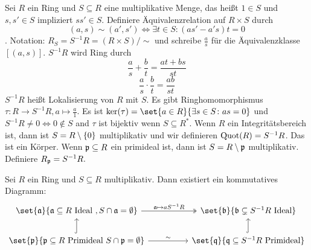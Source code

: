 \begin{Def}
    Sei \(R\) ein Ring und \(S\subseteq R\) eine multiplikative Menge, das heißt \(1\in S\) und \(s,s'\in S\) impliziert \(ss'\in S\).
    Definiere Äquivalenzrelation auf \(R\times S\) durch \[(a,s)\sim (a',s')\iff \exists t\in S\colon (as'-a's)t=0\]. Notation: \(R_S=S^{-1}R=(R\times S)/\sim\) und schreibe \(\frac a s\) für die Äquivalenzklasse \([(a,s)]\).
    \(S^{-1}R\) wird Ring durch 
    \[\frac a s+\frac b t=\frac{at+bs}{st}\]
    \[\frac a s\cdot \frac b t=\frac{ab}{st}\]
    \(S^{-1}R\) heißt Lokalisierung von \(R\) mit \(S\).
    Es gibt Ringhomomorphismus \(\tau:R\to S^{-1}R,a\mapsto \frac a 1\).
    Es ist \(\ker(\tau)=\set{ a\in R}{\exists s\in S\colon as=0}\) und \(S^{-1}R\neq 0 \iff 0\not\in S\) and \(\tau \) ist bijektiv wenn \(S\subseteq R^*\).
    Wenn \(R\) ein Integritätsbereich ist, dann ist \(S=R\setminus\{0\}\) multiplikativ und wir definieren \(\operatorname{Quot}(R)=S^{-1}R\). Das ist ein Körper.
    Wenn \(\mathfrak{p}\subseteq R\) ein primideal ist, dann ist \(S=R\setminus\mathfrak{p}\) multiplikativ. Definiere \(R_{\mathfrak{p}}=S^{-1}R.\)
\end{Def}
\begin{Satz}
    Sei \(R\) ein Ring und \(S\subseteq R\) multiplikativ. Dann existiert ein kommutatives Diagramm:
    $$%
\begin{tikzcd}
{\set{\fraka}{\fraka\subseteq R \text{ Ideal }, S\cap\fraka=\emptyset}} \arrow[rr, "\fraka\mapsto aS^{-1}R", two heads] &  & \set{\frakb}{\frakb\subsetneq S^{-1}R \text{ Ideal}}                   \\
\set{\frakp}{\frakp\subseteq R \text{ Primideal } S\cap\frakp=\emptyset} \arrow[rr, "\sim"] \arrow[u, hook]             &  & \set{\frakq}{\frakq\subseteq S^{-1}R \text{ Primideal}} \arrow[u, hook]
\end{tikzcd}$$
\end{Satz}
